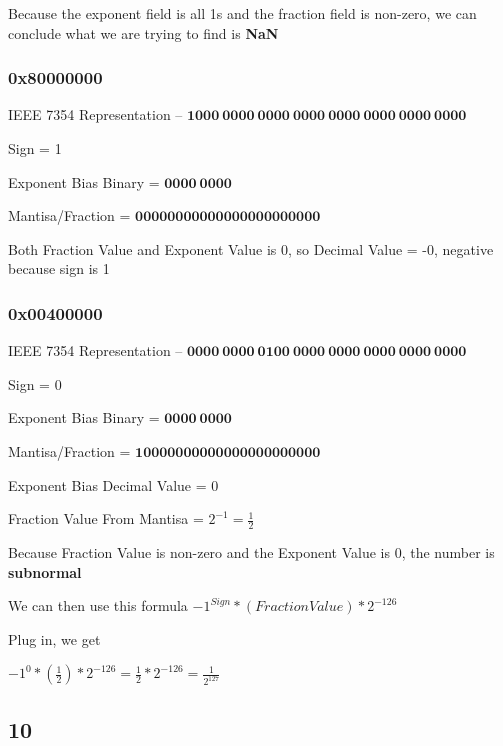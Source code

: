 \documentclass{article}
\newcommand{\boxedanswer}[1]{%

    \fbox{\large\textbf{#1}}%
}
\begin{document}
    Because the exponent field is all 1s and the fraction field is non-zero, we can conclude what we are trying to find is \textbf{NaN}

    \vspace*{0.1in}

    \boxedanswer{NaN(Not a Number)}

    \subsubsection*{0x80000000}

    IEEE 7354 Representation -- $\mathbf{1000\:0000\:0000\:0000\:0000\:0000\:0000\:0000}$

    Sign = 1

    Exponent Bias Binary = $\mathbf{0000\:0000}$

    Mantisa/Fraction = $\mathbf{00000000000000000000000}$

    Both Fraction Value and Exponent Value is 0, so Decimal Value = -0, negative because sign is 1

    \vspace*{0.1in}

    \boxedanswer{-0}

    \newpage

    \subsubsection*{0x00400000}

    IEEE 7354 Representation -- $\mathbf{0000\: 0000\: 0100\: 0000\:0000\:0000\:0000\:0000}$

    Sign = 0

    Exponent Bias Binary = $\mathbf{0000\:0000}$

    Mantisa/Fraction = $\mathbf{10000000000000000000000}$

    Exponent Bias Decimal Value = 0

    Fraction Value From Mantisa = $2^{-1} = \frac{1}{2}$

    Because Fraction Value is non-zero and the Exponent Value is 0, the number is \textbf{subnormal}

    We can then use this formula \hspace*{0.2in} $-1^{Sign} * (Fraction Value) * 2^{-126}$

    Plug in, we get

    $-1^0 * (\frac{1}{2}) * 2^{-126} = \frac{1}{2} * 2^{-126} = \frac{1}{2^{127}}$ \hspace*{0.3in} 

    \subsection*{10}

    
\end{document}
